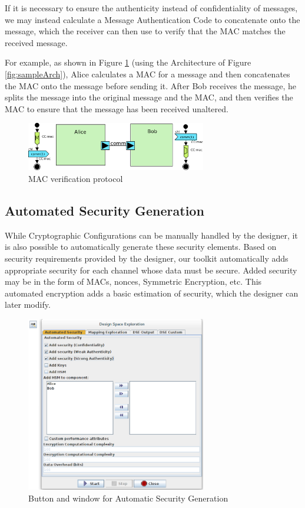 \documentclass{llncs}
\begin{document}
If it is necessary to ensure the authenticity instead of confidentiality of messages, we may instead calculate a Message Authentication Code to concatenate onto the message, which the receiver can then use to verify that the MAC matches the received message.

For example, as shown in Figure \ref{fig:macComp} (using the Architecture of Figure \ref{fig:sampleArch}), Alice calculates a MAC for a message and then concatenates the MAC onto the message before sending it. After Bob receives the message, he splits the message into the original message and the MAC, and then verifies the MAC to ensure that the message has been received unaltered.

\begin{figure}[htbp]
	\centering
 	\includegraphics[width=0.7\textwidth]{figures/securityStuff/macComp.pdf}
	\caption{MAC verification protocol}
	\label{fig:macComp}
\end{figure}

\subsection{Automated Security Generation}

While Cryptographic Configurations can be manually handled by the designer,
it is also possible to automatically generate these security elements. Based on security requirements provided by the designer, our toolkit automatically adds appropriate security for each channel whose data must be secure. Added security may be in the form of MACs, nonces, Symmetric Encryption, etc. This automated encryption adds a basic estimation of security, which the designer can later modify.

\begin{figure}[htbp]
	\centering
 	\includegraphics[width=0.7\textwidth]{figures/securityStuff/autoSec.png}
	\caption{Button and window for Automatic Security Generation}
	\label{fig:autosec}
\end{figure}
\end{document}
